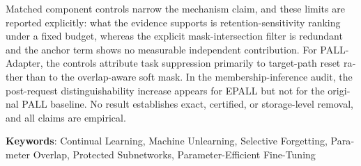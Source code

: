 \begin{latin}
	Matched component controls narrow the mechanism claim, and these limits are reported explicitly: what the evidence supports is retention-sensitivity ranking under a fixed budget, whereas the explicit mask-intersection filter is redundant and the anchor term shows no measurable independent contribution. For PALL-Adapter, the controls attribute task suppression primarily to target-path reset rather than to the overlap-aware soft mask. In the membership-inference audit, the post-request distinguishability increase appears for EPALL but not for the original PALL baseline. No result establishes exact, certified, or storage-level removal, and all claims are empirical.

	\smallskip\noindent\textbf{Keywords}: Continual Learning, Machine Unlearning, Selective Forgetting, Parameter Overlap, Protected Subnetworks, Parameter-Efficient Fine-Tuning

\end{latin}
